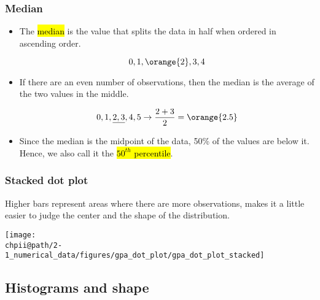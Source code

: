 \documentclass[slidestop,compress,mathserif]{beamer}
\makeatletter
\def\chpii@path{../../Chp 2}
\makeatother
\begin{document}
\begin{frame}
\frametitle{Median}

\begin{itemize}

\item The \hl{median} is the value that splits the data in half when ordered in ascending order.

\[ 0,1,\orange{2},3,4 \]

\item If there are an even number of observations, then the median is the average of the two values in the middle.

\[ 0,1,\underline{2,3},4,5 \rightarrow \frac{2 + 3}{2} = \orange{2.5} \]

\item Since the median is the midpoint of the data, 50\% of the values are below it. Hence, we also call it the \hl{$50^{th}$ percentile}.

\end{itemize}

\end{frame}



\begin{frame}
\frametitle{Stacked dot plot}

Higher bars represent areas where there are more observations, makes it a little easier to judge the center and the shape of the distribution.

\begin{center}
\texttt{[image: \\chpii@path/2-1\_numerical\_data/figures/gpa\_dot\_plot/gpa\_dot\_plot\_stacked]}
\end{center}

\end{frame}


\subsection{Histograms and shape}

\end{document}
